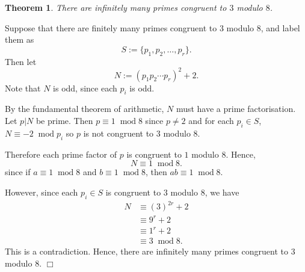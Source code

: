 \documentclass[10pt]{article}
\newtheorem{theorem}{Theorem}
\newenvironment{proof}[1][Proof]{\begin{trivlist}
\item[\hskip \labelsep {\bfseries #1}]}{\end{trivlist}}
\newcommand{\modulo}[1]{\;\operatorname{mod} #1}
\begin{document}
\begin{theorem}
    There are infinitely many primes congruent to $3$ modulo $8$.
\end{theorem}
\begin{proof}
    Suppose that there are finitely many primes congruent to $3$ modulo $8$, and label
    them as
    \begin{equation*}
        S := \{p_1,p_2,\ldots,p_r\}.
    \end{equation*}
    Then let
    \begin{equation*}
        N := (p_1p_2\cdots p_r)^2+2.
    \end{equation*}
    Note that $N$ is odd, since each $p_i$ is odd.
    
    By the fundamental theorem of arithmetic, $N$ must have a prime factorisation. Let
    $p|N$ be prime. Then $p\equiv 1\modulo{8}$ since $p\neq 2$ and for each
    $p_i\in S$, $N\equiv -2\modulo{p_i}$ so $p$ is not congruent to $3$ modulo $8$.
    
    Therefore each prime factor of $p$ is congruent to $1$ modulo $8$. Hence,
    \begin{equation*}
        N\equiv 1\modulo{8}.
    \end{equation*}
    since if $a\equiv 1\modulo{8}$ and $b\equiv 1\modulo{8}$, then $ab\equiv 1\modulo{8}$.
    
    However, since each $p_i\in S$ is congruent to $3$ modulo $8$, we have
    \begin{align*}
        N &\equiv (3)^{2r}+2\\
        &\equiv 9^r+2\\
        &\equiv 1^r+2\\
        &\equiv 3\modulo{8}.
    \end{align*}
    This is a contradiction. Hence, there are infinitely many primes congruent to $3$
    modulo $8$. $\Box$
\end{proof}
\end{document}
